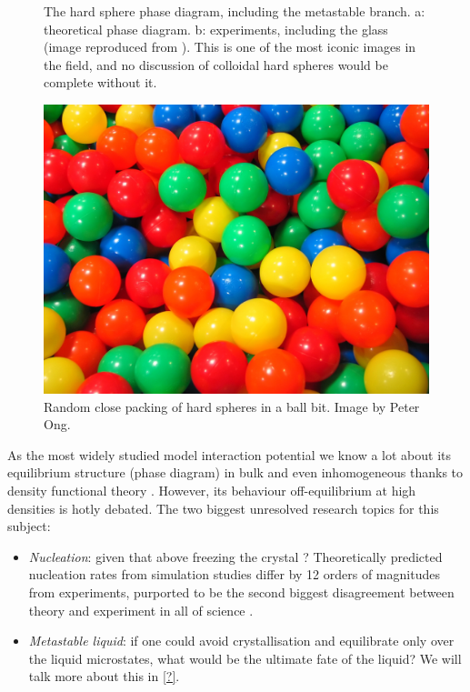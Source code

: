 \documentclass[11pt,twoside]{report}
\begin{document}
\begin{figure}
  \missingfigure[figwidth=\linewidth]{}%
  \caption[The hard sphere phase diagram]{
    The hard sphere phase diagram, including the metastable branch.
    a: theoretical phase diagram.
    b: experiments, including the glass (image reproduced from \cite{?}).
    This is one of the most iconic images in the field, and no discussion of colloidal hard spheres would be complete without it.}
  \label{fig:hs-phase-diagram}
\end{figure}

\begin{figure}
  \includegraphics[width=0.75\linewidth,outer]{ball-pit-horizontal}
  \caption[Random close packing in a ball pit]{
    Random close packing of hard spheres in a ball bit.
    Image by Peter Ong.}
  \label{fig:rcp}
\end{figure}

As the most widely studied model interaction potential we know a lot about its equilibrium structure (phase diagram) in bulk and even inhomogeneous thanks to density functional theory \cite{?,?,?}.
However, its behaviour off-equilibrium at high densities is hotly debated.
The two biggest unresolved research topics for this subject:
\begin{itemize}
\item \emph{Nucleation}: given that above freezing the crystal ? Theoretically predicted nucleation rates from simulation studies differ by 12 orders of magnitudes from experiments, purported to be the second biggest disagreement between theory and experiment in all of science \cite{?}.
\item \emph{Metastable liquid}: if one could avoid crystallisation and equilibrate only over the liquid microstates, what would be the ultimate fate of the liquid?
  We will talk more about this in \ref{?}.
\end{itemize}
\end{document}
